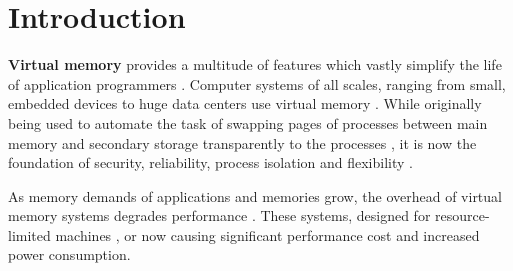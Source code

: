 \chapter{Introduction} %


















\textbf{Virtual memory} provides a multitude of features which vastly simplify the life of application programmers \cite{jacob1998virtualissues}. Computer systems of all scales, ranging from small, embedded devices to huge data centers use virtual memory \cite{bhattacharjee2017architectural}.
While originally being used to automate the task of swapping pages of processes between main memory and secondary storage transparently to the processes \cite{jacob1998virtualissues}, it is now the foundation of security, reliability, process isolation and flexibility \cite{wales1999virtual,jacobVirtualMemoryContemporary1998}.

As memory demands of applications and memories grow, the overhead of virtual memory systems degrades performance \cite{zagieboylo2020cost}. These systems, designed for resource-limited machines \cite{halbuer2023morsels}, or now causing significant performance cost and increased power consumption.

